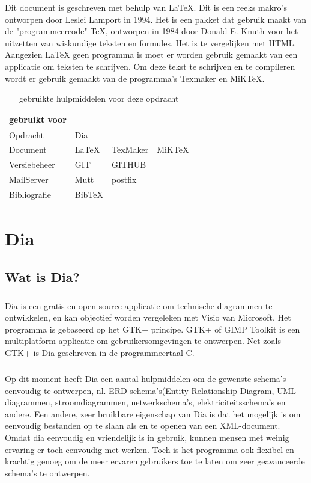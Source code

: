\documentclass[12pt,a4paper]{report}
\begin{document}
\begin{flushleft}

Dit document is geschreven met behulp van \LaTeX{}. Dit is een reeks makro's ontworpen door Leslei Lamport in 1994. Het is een pakket dat gebruik maakt van de "programmeercode" \TeX{}, ontworpen in 1984 door Donald E. Knuth voor het uitzetten van wiskundige teksten en formules. Het is te vergelijken met HTML. Aangezien \LaTeX{} geen programma is moet er worden gebruik gemaakt van een applicatie om teksten te schrijven. Om deze tekst te schrijven en te compileren wordt er gebruik gemaakt van de programma's Texmaker en MiKTeX.

\begin{table}[H]
\begin{tabular}{|l || l  l  l|}
\hline
gebruikt voor &&& \\
\hline
Opdracht & Dia & & \\
Document & LaTeX & TexMaker & MiKTeX\\
Versiebeheer & GIT & GITHUB & \\
MailServer & Mutt & postfix & \\
Bibliografie & BibTeX & &  \\
\hline
\end{tabular}
\centering
\caption{gebruikte hulpmiddelen voor deze opdracht}
\end{table}

\tableofcontents

\chapter{Dia}
\section{Wat is Dia?}
\paragraph*{}
Dia is een gratis en open source applicatie om technische diagrammen te ontwikkelen, en kan objectief worden vergeleken met Visio van Microsoft. Het programma is gebaseerd op het GTK+ principe. GTK+ of GIMP Toolkit is een multiplatform applicatie om gebruikersomgevingen te ontwerpen. Net zoals GTK+ is Dia geschreven in de programmeertaal C. 
\paragraph*{}
Op dit moment heeft Dia een aantal hulpmiddelen om de gewenste schema's eenvoudig te ontwerpen, nl. ERD-schema's(Entity Relationship Diagram, UML diagrammen, stroomdiagrammen, netwerkschema's, elektriciteitsschema's en andere. Een andere, zeer bruikbare eigenschap van Dia is dat het mogelijk is om eenvoudig bestanden op te slaan als en te openen van een XML-document.
Omdat dia eenvoudig en vriendelijk is in gebruik, kunnen mensen met weinig ervaring er toch eenvoudig met werken. Toch is het programma ook flexibel en krachtig genoeg om de meer ervaren gebruikers toe te laten om zeer geavanceerde schema's te ontwerpen.

\end{flushleft}
\end{document}
